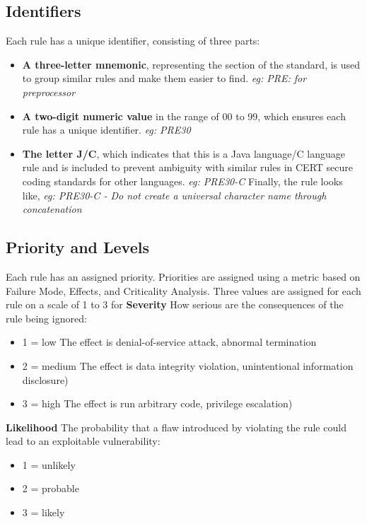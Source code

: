 \subsection{Identifiers}
Each rule has a unique identifier, consisting of three parts:
\begin{itemize}
	\item \textbf{A three-letter mnemonic}, representing the section of the standard, is used to group similar rules and make them easier to find.
	\textit{eg: PRE: for preprocessor}
	\item \textbf{A two-digit numeric value} in the range of 00 to 99, which ensures each rule has a unique identifier.
	\textit{eg: PRE30}
	\item \textbf{The letter J/C}, which indicates that this is a Java language/C language rule and is included to prevent ambiguity with similar rules in CERT secure coding standards for other languages.
	\textit{eg: PRE30-C}
	Finally, the rule looks like,
	\textit{eg: PRE30-C - Do not create a universal character name through concatenation}
\end{itemize}

\subsection{Priority and Levels}
Each rule has an assigned priority. Priorities are assigned using a metric based on Failure
Mode, Effects, and Criticality Analysis. Three values are assigned
for each rule on a scale of 1 to 3 for
\newline
\newline
\textbf{ Severity} How serious are the consequences of the rule being ignored:
\begin{itemize}
	\item 1 = low  
	The effect is denial-of-service attack, abnormal termination 
	\item 2 = medium 
	The effect is data integrity violation, unintentional information disclosure)
	\item 3 = high 
	The effect is run arbitrary code, privilege escalation)
\end{itemize}

\textbf{Likelihood} The probability that a flaw introduced by violating the rule could lead to an exploitable vulnerability:
\begin{itemize}
	\item 1 = unlikely
	\item 2 = probable
	\item 3 = likely
\end{itemize}

